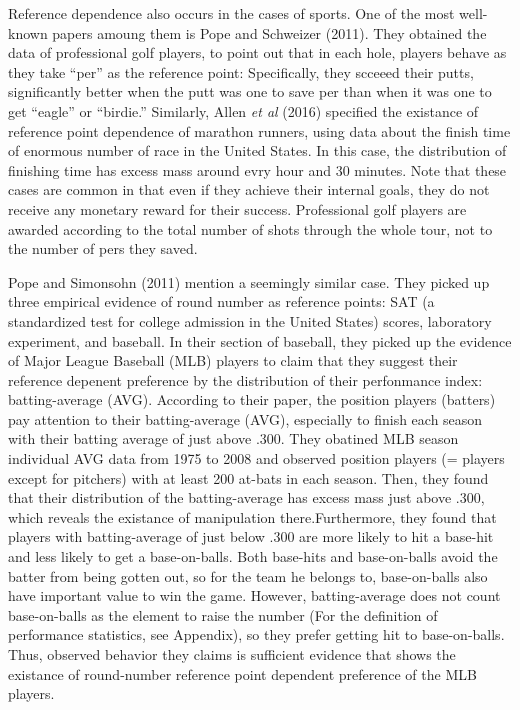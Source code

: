 \documentclass[dvipdfmx, 12pt]{article}
\begin{document}
\vspace{1zw}


Reference dependence also occurs in the cases of sports. One of the most well-known papers amoung them is Pope and Schweizer (2011). They obtained the data of professional golf players, to point out that in each hole, players behave as they take ``per'' as the reference point: Specifically, they scceeed their putts, significantly better when the putt was one to save per than when it was one to get ``eagle'' or ``birdie.'' Similarly, Allen \textit{et al} (2016) specified the existance of reference point dependence of marathon runners, using data about the finish time of enormous number of race in the United States. In this case, the distribution of finishing time has excess mass around evry hour and 30 minutes. Note that these cases are common in that even if they achieve their internal goals, they do not receive any monetary reward for their success. Professional golf players are awarded according to the total number of shots through the whole tour, not to the number of pers they saved.

Pope and Simonsohn (2011) mention a seemingly similar case. They picked up three empirical evidence of round number as reference points: SAT (a standardized test for college admission in the United States) scores, laboratory experiment, and baseball. In their section of baseball, they picked up the evidence of Major League Baseball (MLB) players to claim that they suggest their reference depenent preference by the distribution of their perfonmance index: batting-average (AVG). According to their paper, the position players (batters) pay attention to their batting-average (AVG), especially to finish each season with their batting average of just above .300. They obatined MLB season individual AVG data from 1975 to 2008 and observed position players (= players except for pitchers) with at least 200 at-bats in each season. Then, they found that their distribution of the batting-average has excess mass just above .300, which reveals the existance of manipulation there.Furthermore, they found that players with batting-average of just below .300 are more likely to hit a base-hit and less likely to get a base-on-balls. Both base-hits and base-on-balls avoid the batter from being gotten out, so for the team he belongs to, base-on-balls also have important value to win the game. However, batting-average does not count base-on-balls as the element to raise the number (For the definition of performance statistics, see Appendix), so they prefer getting hit to base-on-balls. Thus, observed behavior they claims is sufficient evidence that shows the existance of round-number reference point dependent preference of the MLB players.
\end{document}
